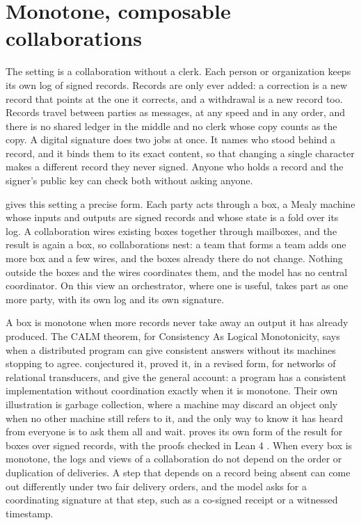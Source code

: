 \section{Monotone, composable collaborations}\label{sec:collab}

The setting is a collaboration without a clerk. Each person or organization keeps its own log of
signed records. Records are only ever added: a correction is a new record that points at the one it
corrects, and a withdrawal is a new record too. Records travel between parties as messages, at any
speed and in any order, and there is no shared ledger in the middle and no clerk whose copy counts as
the copy. A digital signature does two jobs at once. It names who stood behind a record, and it binds
them to its exact content, so that changing a single character makes a different record they never
signed. Anyone who holds a record and the signer's public key can check both without asking anyone.

\citet{karna2026} gives this setting a precise form. Each party acts through a box, a Mealy machine
whose inputs and outputs are signed records and whose state is a fold over its log. A collaboration
wires existing boxes together through mailboxes, and the result is again a box, so collaborations
nest: a team that forms a team adds one more box and a few wires, and the boxes already there do not
change. Nothing outside the boxes and the wires coordinates them, and the model has no central
coordinator. On this view an orchestrator, where one is useful, takes part as one more party, with its
own log and its own signature.

A box is monotone when more records never take away an output it has already produced. The CALM
theorem, for Consistency As Logical Monotonicity, says when a distributed program can give consistent
answers without its machines stopping to agree. \citet{hellerstein2010} conjectured it,
\citet{ameloot2013} proved it, in a revised form, for networks of relational transducers, and \citet{hellerstein2020}
give the general account: a program has a consistent implementation without coordination exactly
when it is monotone. Their own illustration is garbage collection, where a machine may discard an
object only when no other machine still refers to it, and the only way to know it has heard from
everyone is to ask them all and wait. \citet{karna2026} proves its own form of the result for boxes over signed
records, with the proofs checked in Lean 4 \citep{karna2026proofs}. When every box is monotone, the logs and views of a
collaboration do not depend on the order or duplication of deliveries. A step that depends on a
record being absent can come out differently under two fair delivery orders, and the model asks for a
coordinating signature at that step, such as a co-signed receipt or a witnessed timestamp.

